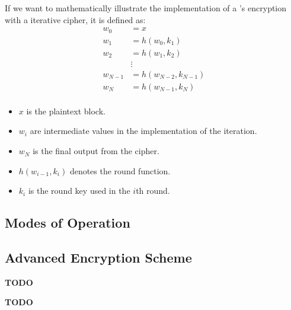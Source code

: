 If we want to mathematically illustrate the implementation of a 's encryption with a iterative cipher, it is defined as:
\begin{align*}
  w_{0} &= x \\
  w_{1} &= h(w_{0}, k_{1}) \\
  w_{2} &= h(w_{1}, k_{2}) \\
        &\vdots \\
  w_{N-1} &= h(w_{N-2}, k_{N-1}) \\
  w_{N} &= h(w_{N-1}, k_{N}) \\
\end{align*}
\begin{itemize}[noitemsep]
\item $x$ is the plaintext block.
\item $w_{i}$ are intermediate values in the implementation of the iteration.
\item $w_{N}$ is the final output from the cipher.
\item $h(w_{i-1}, k_{i})$ denotes the round function.
\item $k_{i}$ is the round key used in the $i$th round.
\end{itemize}

\subsection{Modes of Operation}\label{subsec:Modes_of_Operation}
\begin{definition}\label{def:Mode_of_Operation}
  
\end{definition}

\subsection{Advanced Encryption Scheme}\label{subsec:AES}
\textbf{TODO}
\begin{definition}\label{def:AES}
  \textbf{TODO}
\end{definition}

